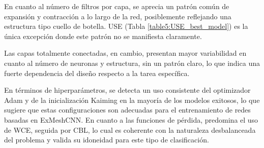 En cuanto al número de filtros por capa, se aprecia un patrón común de expansión y contracción a lo largo de la red, posiblemente reflejando una estructura tipo cuello de botella. USE (Tabla \ref{table5:USE_best_model}) es la única excepción donde este patrón no se manifiesta claramente.

Las capas totalmente conectadas, en cambio, presentan mayor variabilidad en cuanto al número de neuronas y estructura, sin un patrón claro, lo que indica una fuerte dependencia del diseño respecto a la tarea específica.

En términos de hiperparámetros, se detecta un uso consistente del optimizador Adam y de la inicialización Kaiming en la mayoría de los modelos exitosos, lo que sugiere que estas configuraciones son adecuadas para el entrenamiento de redes basadas en ExMeshCNN. En cuanto a las funciones de pérdida, predomina el uso de WCE, seguida por CBL, lo cual es coherente con la naturaleza desbalanceada del problema y valida su idoneidad para este tipo de clasificación.

